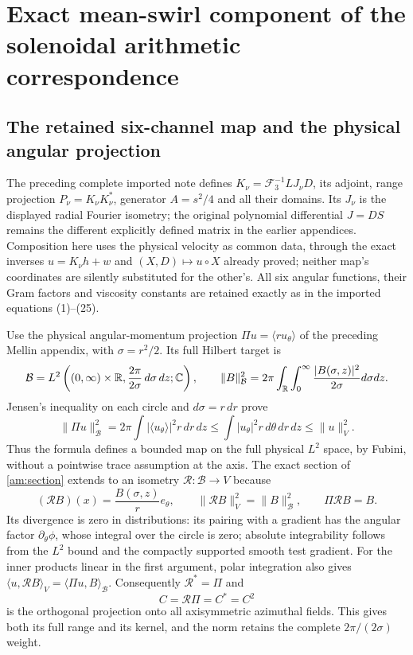 \section*{Exact mean-swirl component of the solenoidal arithmetic correspondence}

\subsection*{The retained six-channel map and the physical angular projection}

The preceding complete imported note defines
$K_\nu=\mathcal F_3^{-1}LJ_\nu D$, its adjoint, range projection
$P_\nu=K_\nu K_\nu^*$, generator $A=s^2/4$ and all their domains.
Its $J_\nu$ is the displayed radial Fourier isometry; the original
polynomial differential $J=DS$ remains the different explicitly
defined matrix in the earlier appendices. Composition here uses
the physical velocity as common data, through the exact inverses
$u=K_\nu h+w$ and $(X,D)\mapsto u\circ X$ already proved; neither
map's coordinates are silently substituted for the other's.
All six angular functions, their Gram factors and viscosity constants
are retained exactly as in the imported equations (1)--(25).

Use the physical angular-momentum projection
$\Pi u=\langle r u_\theta\rangle$ of the preceding Mellin appendix,
with $\sigma=r^2/2$. Its full Hilbert target is
\[
 \mathcal B=L^2\left((0,\infty)\times\mathbb R,
                   \frac{2\pi}{2\sigma}\,d\sigma\,dz;\mathbb C\right),
 \qquad
 \|B\|_{\mathcal B}^2=2\pi\int_\mathbb R\int_0^\infty
                       \frac{|B(\sigma,z)|^2}{2\sigma}d\sigma dz.
\]
Jensen's inequality on each circle and $d\sigma=r\,dr$ prove
\[
 \|\Pi u\|_{\mathcal B}^2
 =2\pi\int|\langle u_\theta\rangle|^2r\,dr\,dz
 \leq\int|u_\theta|^2r\,d\theta\,dr\,dz\leq\|u\|_V^2.
\]
Thus the formula defines a bounded map on the full physical $L^2$
space, by Fubini, without a pointwise trace assumption at the axis.
The exact section of \eqref{am:section} extends to an isometry
$\mathcal R:\mathcal B\to V$ because
\[
 (\mathcal RB)(x)=\frac{B(\sigma,z)}r e_\theta,
 \qquad \|\mathcal RB\|_V^2=\|B\|_{\mathcal B}^2,
 \qquad \Pi\mathcal RB=B.
\]
Its divergence is zero in distributions: its pairing with a gradient
has the angular factor $\partial_\theta\phi$, whose integral over
the circle is zero; absolute integrability follows from the $L^2$
bound and the compactly supported smooth test gradient.
For the inner products linear in the first argument, polar integration
also gives
$\langle u,\mathcal RB\rangle_V
 =\langle\Pi u,B\rangle_{\mathcal B}$.
Consequently $\mathcal R^*=\Pi$ and
\[
 C=\mathcal R\Pi=C^*=C^2
\]
is the orthogonal projection onto all axisymmetric azimuthal fields.
This gives both its full range and its kernel, and the norm retains
the complete $2\pi/(2\sigma)$ weight.

